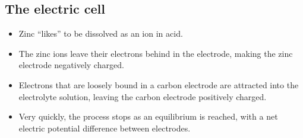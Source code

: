 \documentclass[aspectratio=169,
hyperref={colorlinks,urlcolor=blue}
]{beamer}
\begin{document}
\subsection{The electric cell}
\label{subsec:theelectriccell}
{
\begin{itemize}
\item Zinc ``likes'' to be dissolved as an ion in acid.
\item The zinc ions leave their electrons behind in the electrode, making the zinc electrode negatively charged.
\item Electrons that are loosely bound in a carbon electrode are attracted into the electrolyte solution, leaving the carbon electrode positively charged.
\item Very quickly, the process stops as an equilibrium is reached, with a net electric potential difference between electrodes.
\end{itemize}
}
\end{document}
